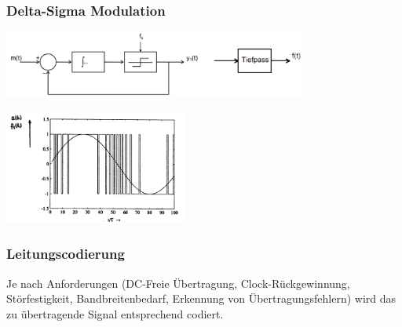 \subsubsection{Delta-Sigma Modulation}
\begin{minipage}{10cm}
	\includegraphics[width=10cm]{bilder/dig_delta_sigma_modulator_schema}
\end{minipage}
\begin{minipage}{6cm}
	\includegraphics[width=6cm]{bilder/dig_delta_sigma_modulation}
\end{minipage}
	

\newpage
\subsubsection{Leitungscodierung }
Je nach Anforderungen (DC-Freie Übertragung, Clock-Rückgewinnung, Störfestigkeit,
Bandbreitenbedarf, Erkennung von Übertragungsfehlern) wird das zu übertragende Signal entsprechend
codiert.

